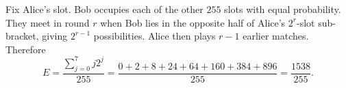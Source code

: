 Fix Alice's slot. Bob occupies each of the other $255$ slots with equal probability. They meet in round $r$ when Bob lies in the opposite half of Alice's $2^r$-slot sub-bracket, giving $2^{r-1}$ possibilities. Alice then plays $r-1$ earlier matches. Therefore
\[E=\dfrac{\sum_{j=0}^7j2^j}{255}=\dfrac{0+2+8+24+64+160+384+896}{255}=\boxed{\dfrac{1538}{255}}.\]
